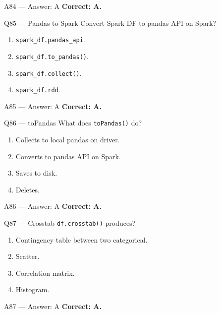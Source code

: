 \documentclass[aspectratio=169,9pt]{beamer}
\begin{document}
	\begin{frame}{A84 — Answer: A}
		\textbf{Correct: A.}
	\end{frame}
	
	\begin{frame}{Q85 — Pandas to Spark}
		Convert Spark DF to pandas API on Spark?
		\begin{enumerate}[label=\Alph*.]
			\item \texttt{spark\_df.pandas\_api}.
			\item \texttt{spark\_df.to\_pandas()}.
			\item \texttt{spark\_df.collect()}.
			\item \texttt{spark\_df.rdd}.
		\end{enumerate}
	\end{frame}
	
	\begin{frame}{A85 — Answer: A}
		\textbf{Correct: A.}
	\end{frame}
	
	\begin{frame}{Q86 — toPandas}
		What does \texttt{toPandas()} do?
		\begin{enumerate}[label=\Alph*.]
			\item Collects to local pandas on driver.
			\item Converts to pandas API on Spark.
			\item Saves to disk.
			\item Deletes.
		\end{enumerate}
	\end{frame}
	
	\begin{frame}{A86 — Answer: A}
		\textbf{Correct: A.}
	\end{frame}
	
	\begin{frame}{Q87 — Crosstab}
		\texttt{df.crosstab()} produces?
		\begin{enumerate}[label=\Alph*.]
			\item Contingency table between two categorical.
			\item Scatter.
			\item Correlation matrix.
			\item Histogram.
		\end{enumerate}
	\end{frame}
	
	\begin{frame}{A87 — Answer: A}
		\textbf{Correct: A.}
	\end{frame}
	
\end{document}
